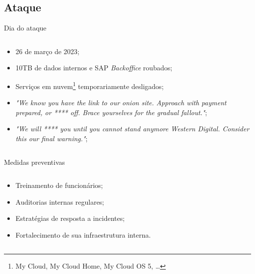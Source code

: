 \documentclass[bookmarks=false,aspectratio=169,9pt]{beamer}
\begin{document}
\subsection{Ataque}
\begin{frame}{Dia do ataque}
	\begin{columns}
		\begin{column}{0.5\textwidth}
			\begin{itemize}
				\item 26 de março de 2023;
				\item 10TB de dados internos e SAP \textit{Backoffice} roubados\cite{bleepingcomputer_1};
				\item Serviços em nuvem\footnote{My Cloud, My Cloud Home, My Cloud OS 5, \dots} temporariamente desligados;
				\item \textit{"We know you have the link to our onion site. Approach with payment prepared, or **** off. Brace yourselves for the gradual fallout."}\cite{twitter};
				\item \textit{"We will **** you until you cannot stand anymore Western Digital. Consider this our final warning."}\cite{techcrunch};
			\end{itemize}
		\end{column}
	\end{columns}
\end{frame}
\begin{frame}{Medidas preventivas}
	\begin{columns}
		\begin{column}{0.5\textwidth}
			\begin{itemize}
				\item Treinamento de funcionários;
				\item Auditorias internas regulares;
				\item Estratégias de resposta a incidentes;
				\item Fortalecimento de sua infraestrutura interna.
			\end{itemize}
		\end{column}
	\end{columns}
\end{frame}
\end{document}
